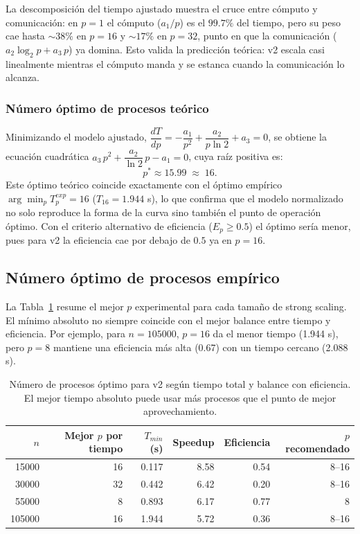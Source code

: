 \documentclass[11pt,a4paper]{article}
\begin{document}
La descomposición del tiempo ajustado muestra el cruce entre cómputo y comunicación: en $p=1$ el
cómputo ($a_1/p$) es el $99.7\%$ del tiempo, pero su peso cae hasta $\sim38\%$ en $p=16$ y
$\sim17\%$ en $p=32$, punto en que la comunicación ($a_2\log_2 p + a_3\,p$) ya domina. Esto valida
la predicción teórica: v2 escala casi linealmente mientras el cómputo manda y se estanca cuando la
comunicación lo alcanza.

\subsubsection{Número óptimo de procesos teórico}

Minimizando el modelo ajustado, $\dfrac{dT}{dp} = -\dfrac{a_1}{p^2} + \dfrac{a_2}{p\ln 2} + a_3 = 0$,
se obtiene la ecuación cuadrática $a_3\,p^2 + \dfrac{a_2}{\ln 2}\,p - a_1 = 0$, cuya raíz positiva es:
\[
p^* \approx 15.99 \;\approx\; 16.
\]
Este óptimo teórico coincide exactamente con el óptimo empírico $\arg\min_p T_p^{exp} = 16$
($T_{16} = 1.944$ s), lo que confirma que el modelo normalizado no solo reproduce la forma de la
curva sino también el punto de operación óptimo. Con el criterio alternativo de eficiencia
($E_p \geq 0.5$) el óptimo sería menor, pues para v2 la eficiencia cae por debajo de $0.5$ ya en
$p=16$.


\subsection{Número óptimo de procesos empírico}

La Tabla~\ref{tab:v2-optimal-p} resume el mejor $p$ experimental para cada tamaño de strong
scaling. El mínimo absoluto no siempre coincide con el mejor balance entre tiempo y eficiencia.
Por ejemplo, para $n=105000$, $p=16$ da el menor tiempo (1.944 s), pero $p=8$ mantiene una
eficiencia más alta (0.67) con un tiempo cercano (2.088 s).

\begin{table}[H]
\centering
\begin{tabular}{rrrrrr}
\toprule
$n$ & Mejor $p$ por tiempo & $T_{min}$ (s) & Speedup & Eficiencia & $p$ recomendado \\
\midrule
15000  & 16 & 0.117 & 8.58 & 0.54 & 8--16 \\
30000  & 32 & 0.442 & 6.42 & 0.20 & 8--16 \\
55000  & 8  & 0.893 & 6.17 & 0.77 & 8 \\
105000 & 16 & 1.944 & 5.72 & 0.36 & 8--16 \\
\bottomrule
\end{tabular}
\caption{Número de procesos óptimo para v2 según tiempo total y balance con eficiencia. El mejor tiempo absoluto puede usar más procesos que el punto de mejor aprovechamiento.}
\label{tab:v2-optimal-p}
\end{table}
\end{document}
